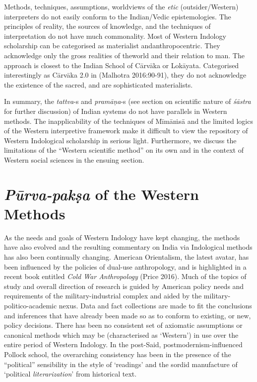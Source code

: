 Methods, techniques, assumptions, worldviews of the {\sl etic} (outsider/\break Western) interpreters do not easily conform to the Indian/Vedic epistemologies. The principles of reality, the sources of knowledge, and the techniques of interpretation do not have much commonality. Most of Western Indology scholarship can be categorised as materialist and\break anthropocentric. They acknowledge only the gross realities of the\break world and their relation to man. The approach is closest to the Indian School of Cārvāka or Lokāyata. Categorised interestingly as Cārvāka 2.0 in (Malhotra 2016:90-91), they do not acknowledge the existence of the sacred, and are sophisticated materialists.

In summary, the {\sl tattva}-s and {\sl pramāṇa}-s (see section on scientific nature of {\sl śāstra} for further discussion) of Indian systems do not have parallels in Western methods. The inapplicability of the techniques of Mīmāṁsā and the limited logics of the Western interpretive framework make it difficult to view the repository of Western Indological scholarship in serious light. Furthermore, we discuss the limitations of the ``Western scientific method'' on its own and in the context of Western social sciences in the ensuing section.\\[-20pt]

\section*{{{\sl\bfseries Pūrva-pakṣa}\relax} of the Western Methods}

As the needs and goals of Western Indology have kept changing, the methods have also evolved and the resulting commentary on India via Indological methods has also been continually changing. American Orientalism, the latest avatar, has been influenced by the policies of dual-use anthropology, and is highlighted in a recent book entitled {\sl Cold War Anthropology} (Price 2016). Much of the topics of study and overall direction of research is guided by American policy needs and requirements of the military-industrial complex and aided by the military-politico-academic nexus. Data and fact collections are made to fit the conclusions and inferences that have already been made so as to conform to existing, or new, policy decisions. There has been no consistent set of axiomatic assumptions or canonical methods which may be (characterised as `Western') in use over the entire period of Western Indology. In the post-Said, postmodernism-influenced Pollock school, the overarching consistency has been in the presence of the ``political'' sensibility in the style of `readings' and the sordid manufacture of `political {\sl literarization}' from historical text.

